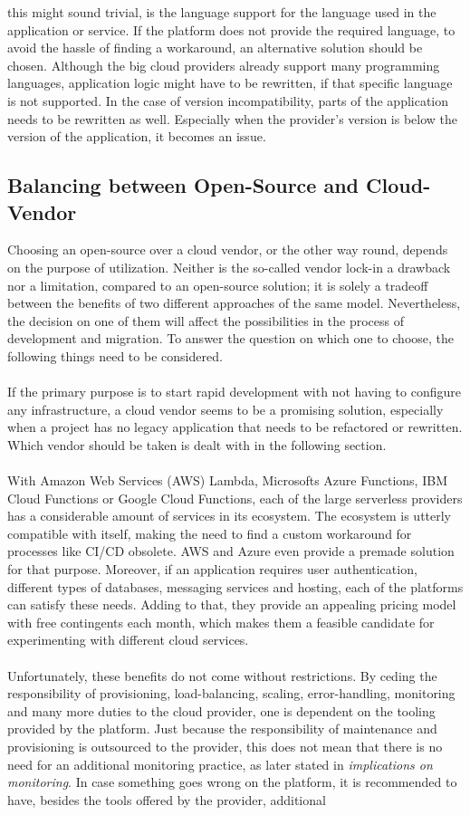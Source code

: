 \documentclass[a4paper,twoside,11pt, pagesize]{scrartcl}
\begin{document}
this might sound trivial, is the language support for the language used in the application or service. If the platform does not provide the required language, to avoid the hassle of finding a workaround, an alternative solution should be chosen. Although the big cloud providers already support many programming languages, application logic might have to be rewritten, if that specific language is not supported. In the case of version incompatibility, parts of the application needs to be rewritten as well. Especially when the provider's version is below the version of the application, it becomes an issue.
\subsection{Balancing between Open-Source and Cloud-Vendor}
Choosing an open-source over a cloud vendor, or the other way round, depends on the purpose of utilization. Neither is the so-called vendor lock-in a drawback nor a limitation, compared to an open-source solution; it is solely a tradeoff between the benefits of two different approaches of the same model. Nevertheless, the decision on one of them will affect the possibilities in the process of development and migration. To answer the question on which one to choose, the following things need to be considered.\\\\ If the primary purpose is to start rapid development with not having to configure any infrastructure, a cloud vendor seems to be a promising solution, especially when a project has no legacy application that needs to be refactored or rewritten. Which vendor should be taken is dealt with in the following section.\\\\ With Amazon Web Services (AWS) Lambda, Microsofts Azure Functions, IBM Cloud Functions or Google Cloud Functions, each of the large serverless providers has a considerable amount of services in its ecosystem. The ecosystem is utterly compatible with itself, making the need to find a custom workaround for processes like CI/CD obsolete. AWS and Azure even provide a premade solution for that purpose. Moreover, if an application requires user authentication, different types of databases, messaging services and hosting, each of the platforms can satisfy these needs. Adding to that, they provide an appealing pricing model with free contingents each month, which makes them a feasible candidate for experimenting with different cloud services.\\\\ Unfortunately, these benefits do not come without restrictions. By ceding the responsibility of provisioning, load-balancing, scaling, error-handling, monitoring and many more duties to the cloud provider, one is dependent on the tooling provided by the platform. Just because the responsibility of maintenance and provisioning is outsourced to the provider, this does not mean that there is no need for an additional monitoring practice, as later stated in \textit{implications on monitoring}. In case something goes wrong on the platform, it is recommended to have, besides the tools offered by the provider, additional 
\end{document}
